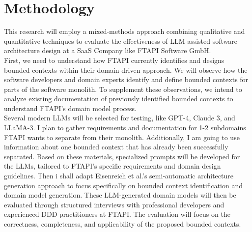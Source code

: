 \documentclass[12pt,a4paper]{article}
\begin{document}
\section{Methodology}
This research will employ a mixed-methods approach combining qualitative and quantitative techniques to evaluate the effectiveness of LLM-assisted software architecture design at a SaaS Company like FTAPI Software GmbH.\\ First, we need to understand how FTAPI currently identifies and designs bounded contexts within their domain-driven approach. We will observe how the software developers and domain experts identify and define bounded contexts for parts of the software monolith. To supplement these observations, we intend to analyze existing documentation of previously identified bounded contexts to understand FTAPI's domain model process. \\ Several modern LLMs will be selected for testing, like GPT-4, Claude 3, and LLaMA-3. I plan to gather requirements and documentation for 1-2 subdomains FTAPI wants to separate from their monolith. Additionally, I am going to use information about one bounded context that has already been successfully separated. Based on these materials, specialized prompts will be developed for the LLMs, tailored to FTAPI's specific requirements and domain design guidelines. Then i shall adapt Eisenreich et al.'s semi-automatic architecture generation approach to focus specifically on bounded context identification and domain model generation. These LLM-generated domain models will then be evaluated through structured interviews with professional developers and experienced DDD practitioners at FTAPI. The evaluation will focus on the correctness, completeness, and applicability of the proposed bounded contexts.

\printbibliography
\end{document}
